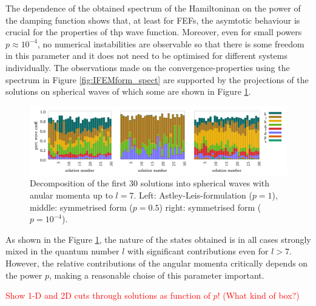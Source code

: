 The dependence of the obtained spectrum of the Hamiltoninan on the power of the damping function shows that, at least for FEFs, the asymtotic behaviour is crucial for the properties of thp wave function. 
Moreover, even for small powers $p\approx 10^{-4}$, no numerical instabilities are observable so that there is some freedom in this parameter and it does not need to be optimised for different systems individually.
The observations made on the convergence-properties using the spectrum in Figure \ref{fig:IFEMform_spect} are supported by the projections of the solutions on spherical waves of which some are shown in Figure \ref{fig:IFEMform_project}.
\begin{figure}
\includegraphics[width=\textwidth]{Figures/Ifem_forms}
\caption{Decomposition of the first 30 solutions into spherical waves with anular momenta up to $l=7$.
Left: Astley-Leis-formulation ($p=1$), middle: symmetrised form ($p=0.5$) right: symmetrised form ($p=10^{-4}$).}
\label{fig:IFEMform_project}
\end{figure}

As shown in the Figure \ref{fig:IFEMform_project}, the nature of the states obtained is in all cases strongly mixed in the quantum number $l$ with significant contributions even for $l>7$.
However, the relative contributions of the angular momenta critically depends on the power $p$, making a reasonable choise of this parameter important.

\textcolor{red}{Show 1-D and 2D cuts through solutions as function of $p$!  (What kind of box?)}

